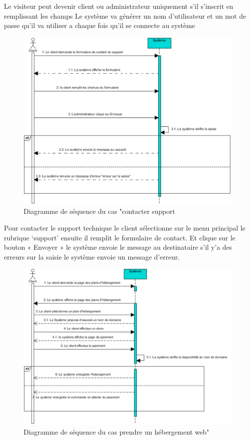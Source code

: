 \documentclass[a4paper, 12pt]{report}
\begin{document}
\noindent Le visiteur peut devenir client ou administrateur uniquement s’il s’inscrit en remplissant les champs 
Le système va générer un nom d’utilisateur et un mot de passe qu’il va utiliser a chaque fois qu’il se connecte au système  
\begin{figure}[H]
	\centering
	\includegraphics{img/sequence/4}
	\caption{Diagramme de séquence du cas "contacter support}
	\label{Tux}
\end{figure}
\noindent Pour contacter le support technique le client sélectionne sur le menu principal le rubrique ‘support’ ensuite il remplit le formulaire de contact. Et clique sur le bouton « Envoyer » le système envoie le message au destinataire s’il y’a des erreurs sur la saisie le système envoie un message d’erreur.   
\begin{figure}[H]
	\centering
	\includegraphics{img/sequence/5}
	\caption{Diagramme de séquence du cas prendre un hébergement web"}
	\label{Tux}
\end{figure}
\end{document}
